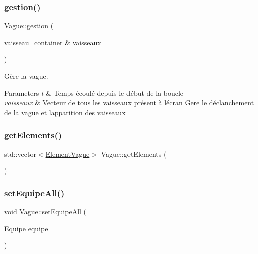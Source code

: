 \mbox{\label{class_vague_ae544359836d36fb2d49c26af9bd7ff30}} 
\subsubsection{\texorpdfstring{gestion()}{gestion()}}
{\footnotesize\ttfamily Vague\+::gestion (\begin{DoxyParamCaption}\item[{\mbox{\hyperlink{def__type_8h_ad123ed7c93f42c8dd68e4af28b16b639}{vaisseau\+\_\+container}} \&}]{vaisseaux }\end{DoxyParamCaption})}



Gère la vague. 


\begin{DoxyParams}{Parameters}
{\em t} & Temps écoulé depuis le début de la boucle \\
\hline
{\em vaisseaux} & Vecteur de tous les vaisseaux présent à l\textquotesingle{}écran Gere le déclanchement de la vague et l\textquotesingle{}apparition des vaisseaux \\
\hline
\end{DoxyParams}
\mbox{\label{class_vague_ae7437097c10ed89cbd923f816450e334}} 
\subsubsection{\texorpdfstring{get\+Elements()}{getElements()}}
{\footnotesize\ttfamily std\+::vector$<$\mbox{\hyperlink{struct_element_vague}{Element\+Vague}}$>$ Vague\+::get\+Elements (\begin{DoxyParamCaption}{ }\end{DoxyParamCaption})\hspace{0.3cm}{\ttfamily [inline]}}

\mbox{\label{class_vague_aed7f0a70cc0d93ed686af4e100376974}} 
\subsubsection{\texorpdfstring{set\+Equipe\+All()}{setEquipeAll()}}
{\footnotesize\ttfamily void Vague\+::set\+Equipe\+All (\begin{DoxyParamCaption}\item[{\mbox{\hyperlink{constantes_8h_a08fa5554288d5031a8f3bb83cc04ee83}{Equipe}}}]{equipe }\end{DoxyParamCaption})\hspace{0.3cm}{\ttfamily [inline]}}

